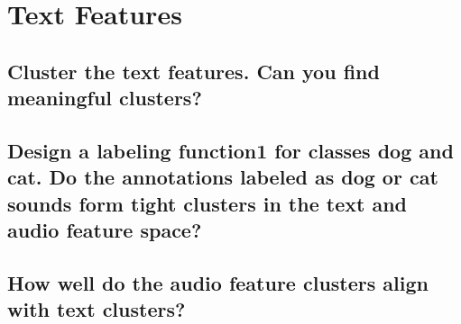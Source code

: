 
\section{Text Features}
\label{sec:Text Features}
\lipsum[4]

\subsection{Cluster the text features. Can you find meaningful clusters?}
\label{sec:Text Features:a}


\subsection{Design a labeling function1 for classes dog and cat. Do the annotations labeled as dog or cat sounds
form tight clusters in the text and audio feature space?}
\label{sec:Text Features:b}


\subsection{How well do the audio feature clusters align with text clusters?}
\label{sec:Text Features:c}





